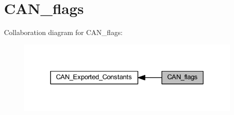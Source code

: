 \hypertarget{group___c_a_n__flags}{}\section{C\+A\+N\+\_\+flags}
\label{group___c_a_n__flags}
Collaboration diagram for C\+A\+N\+\_\+flags\+:
\nopagebreak
\begin{figure}[H]
\begin{center}
\leavevmode
\includegraphics[width=309pt]{group___c_a_n__flags}
\end{center}
\end{figure}
